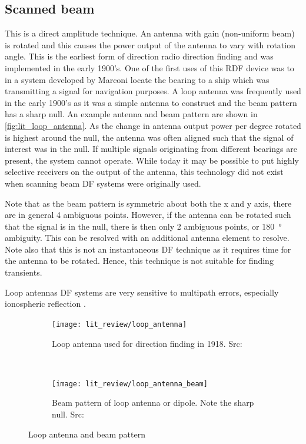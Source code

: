 \subsection{Scanned beam}
This is a direct amplitude technique. An antenna with gain (non-uniform beam) is rotated and this causes the power output of the antenna to vary with rotation angle. This is the earliest form of direction radio direction finding and was implemented in the early 1900's. 
One of the first uses of this RDF device was to in a system developed by Marconi locate the bearing to a ship which was transmitting a signal for navigation purposes. A loop antenna was frequently used in the early 1900's as it was a simple antenna to construct and the beam pattern has a sharp null. 
An example antenna and beam pattern are shown in \autoref{fig:lit_loop_antenna}. As the change in antenna output power per degree rotated is highest around the null, the antenna was often aligned such that the signal of interest was in the null. 
If multiple signals originating from different bearings are present, the system cannot operate. 
While today it may be possible to put highly selective receivers on the output of the antenna, this technology did not exist when scanning beam DF systems were originally used.

Note that as the beam pattern is symmetric about both the x and y axis, there are in general 4 ambiguous points. However, if the antenna can be rotated such that the signal is in the null, there is then only 2 ambiguous points, or \SI{180}{\degree} ambiguity. This can be resolved with an  additional antenna element to resolve. Note also that this is not an instantaneous DF technique as it requires time for the antenna to be rotated. Hence, this technique is not suitable for finding transients. 

Loop antennas DF systems are very sensitive to multipath errors, especially ionospheric reflection \cite{jenkins1991smallaperture}. 
\begin{figure}
  \centering
  \begin{subfigure}[b]{0.48\textwidth}
    \centering
    \texttt{[image: lit\_review/loop\_antenna]}
    \caption{Loop antenna used for direction finding in 1918. Src: \cite{grabau1989funkpeiltechnik}}
  \end{subfigure}
  ~
  \begin{subfigure}[b]{0.48\textwidth}
    \centering
   \texttt{[image: lit\_review/loop\_antenna\_beam]}
   \caption{Beam pattern of loop antenna or dipole. Note the sharp null. Src: \cite{jenkins1991smallaperture}}
  \end{subfigure}
  \caption{Loop antenna and beam pattern}
  \label{fig:lit_loop_antenna}
\end{figure}


